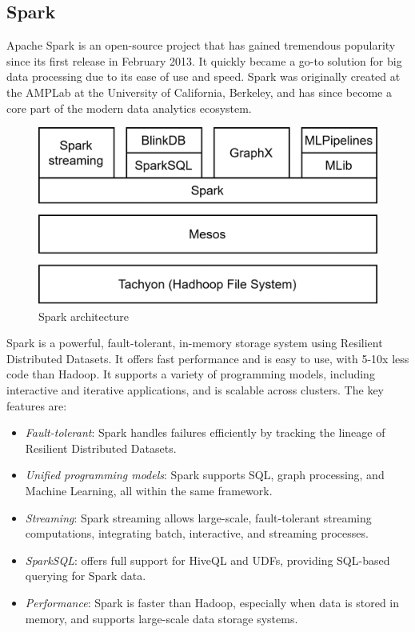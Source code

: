 \subsection{Spark}
Apache Spark is an open-source project that has gained tremendous popularity since its first release in February 2013. 
It quickly became a go-to solution for big data processing due to its ease of use and speed. 
Spark was originally created at the AMPLab at the University of California, Berkeley, and has since become a core part of the modern data analytics ecosystem.
\begin{figure}[H]
    \centering
    \includegraphics[width=0.75\linewidth]{images/spark.png}
    \caption{Spark architecture}
\end{figure}
Spark is a powerful, fault-tolerant, in-memory storage system using Resilient Distributed Datasets.
It offers fast performance and is easy to use, with 5-10x less code than Hadoop. 
It supports a variety of programming models, including interactive and iterative applications, and is scalable across clusters.
The key features are: 
\begin{itemize}
    \item \textit{Fault-tolerant}: Spark handles failures efficiently by tracking the lineage of Resilient Distributed Datasets.
    \item \textit{Unified programming models}: Spark supports SQL, graph processing, and Machine Learning, all within the same framework.
    \item \textit{Streaming}: Spark streaming allows large-scale, fault-tolerant streaming computations, integrating batch, interactive, and streaming processes.
    \item \textit{SparkSQL}: offers full support for HiveQL and UDFs, providing SQL-based querying for Spark data.
    \item \textit{Performance}: Spark is faster than Hadoop, especially when data is stored in memory, and supports large-scale data storage systems.
\end{itemize}
